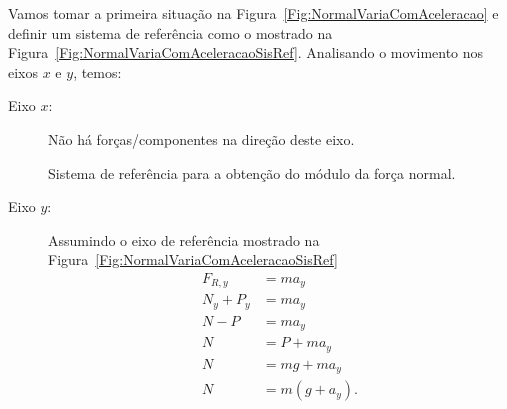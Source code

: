 Vamos tomar a primeira situação na Figura~\ref{Fig:NormalVariaComAceleracao} e definir um sistema de referência como o mostrado na Figura~\ref{Fig:NormalVariaComAceleracaoSisRef}. Analisando o movimento nos eixos $x$ e $y$, temos:
\begin{description}
    \item[Eixo $x$:] Não há forças/componentes na direção deste eixo.
    
\begin{marginfigure}
\centering
{}
\caption{Sistema de referência para a obtenção do módulo da força normal.\label{Fig:NormalVariaComAceleracaoSisRef}}
\end{marginfigure}

    \item[Eixo $y$:] Assumindo o eixo de referência mostrado na Figura~\ref{Fig:NormalVariaComAceleracaoSisRef}
        \begin{align}
            F_{R, y} &= m a_y \\
            N_y + P_y &= m a_y \\
            N - P &= m a_y \\
            N &= P + m a_y \\
            N &= mg + m a_y \\
            N &= m(g + a_y). \label{Eq:NormalComAceleracao}
        \end{align}
\end{description}

